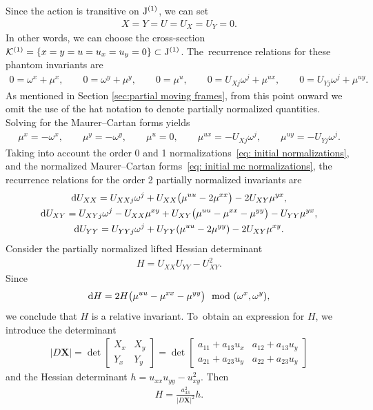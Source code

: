\documentclass[pdftex]{sigma}%
\numberwithin{equation}{section}
\newcommand{\J}{{\rm J}}
\newcommand{\vX}{\mathbf{X}}
\begin{document}
Since the action is transitive on $\J^{(1)}$, we can set
%
\begin{gather}\label{eq: initial normalizations}
X = Y = U = U_X = U_Y = 0.
\end{gather}
%
In other words, we can choose the cross-section $\mathcal{K}^{(1)}=\{x=y=u=u_x=u_y=0\}\subset \J^{(1)}$. The~recurrence relations for these phantom invariants are
\begin{gather*}
0 = \omega^x + \mu^x,\qquad
0 = \omega^y + \mu^y,\qquad
0 = \mu^u,\qquad
0 = U_{Xj} \omega^j + \mu^{ux},\qquad
0 = U_{Yj} \omega^j + \mu^{uy}.
\end{gather*}
As mentioned in Section \ref{sec:partial moving frames}, from this point onward we omit the use of the hat notation to denote partially normalized quantities. Solving for the Maurer--Cartan forms yields
%
\begin{gather}\label{eq: initial mc normalizations}
\mu^x = -\omega^x,\qquad \mu^y = -\omega^y,\qquad \mu^u = 0,\qquad
\mu^{ux} = -U_{Xj} \omega^j,\qquad \mu^{uy} = -U_{Yj} \omega^j.
\end{gather}
%
Taking into account the order 0 and 1 normalizations~\eqref{eq: initial normalizations}, and the normalized Maurer--Cartan forms~\eqref{eq: initial mc normalizations}, the recurrence relations for the order 2 partially normalized invariants are
%
\begin{gather}
{\rm d}U_{XX} = U_{XXj} \omega^j + U_{XX}\big(\mu^{uu} - 2\mu^{xx}\big) - 2U_{XY} \mu^{yx},\nonumber
\\
{\rm d}U_{XY} = U_{XYj} \omega^j - U_{XX}\mu^{xy} + U_{XY}\big(\mu^{uu} - \mu^{xx} - \mu^{yy}\big) - U_{YY}\mu^{yx},\nonumber
\\
{\rm d}U_{YY} = U_{YYj} \omega^j + U_{YY}(\mu^{uu}-2\mu^{yy}) - 2U_{XY}\mu^{xy}.
\label{eq: order 2 recurrence relations}
\end{gather}
%
Consider the partially normalized lifted Hessian determinant
\begin{gather*}
H=U_{XX}U_{YY} - U_{XY}^2.
\end{gather*}
Since
\begin{gather*}
{\rm d}H = 2 H\big(\mu^{uu} - \mu^{xx} - \mu^{yy}\big) \mod(\omega^x,\omega^y),
\end{gather*}
we conclude that $H$ is a relative invariant. To~obtain an expression for $H$, we introduce the determinant
%
\begin{gather}\label{eq:det}
|D\vX| = \det
\begin{bmatrix}
X_x & X_y \\
Y_x & Y_y
\end{bmatrix} = \det
\begin{bmatrix}
a_{11} + a_{13} u_x & a_{12} + a_{13} u_y \\
a_{21} + a_{23} u_y & a_{22} + a_{23} u_y
\end{bmatrix}
\end{gather}
%
and the Hessian determinant $h=u_{xx} u_{yy} - u_{xy}^2$. Then
\begin{gather*}
H = \frac{a_{33}^2}{|D\vX|^2} h.
\end{gather*}
\end{document}
